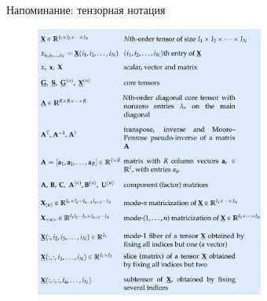 
\usepackage{tikz}
\usepackage{amsmath}
\usepackage[english,russian]{babel}
\usepackage[labelformat=empty]{caption}

\usepackage{graphicx,animate}
\usepackage{animate}
\usepackage{svg}
\usepackage{subcaption}

\usepackage{ stmaryrd }

\usetikzlibrary{arrows,shapes,positioning,shadows,trees}
\newcommand*{\defeq}{\stackrel{\text{def}}{=}}
\newcommand{\tensor}[1]{\underline{\textbf{#1}}}
\newcommand{\M}[1]{\textbf{#1}}
\newcommand{\norm}[1]{\lVert #1 \rVert }

\begin{frame}[plain]
\titlepage
\end{frame}
\begin{frame}{Напоминание: тензорная нотация}

\begin{figure}
    \centering
    \includegraphics[width=0.67\textwidth]{lecture_11/figs/tensor_notation.png}
\end{figure}

\end{frame}

